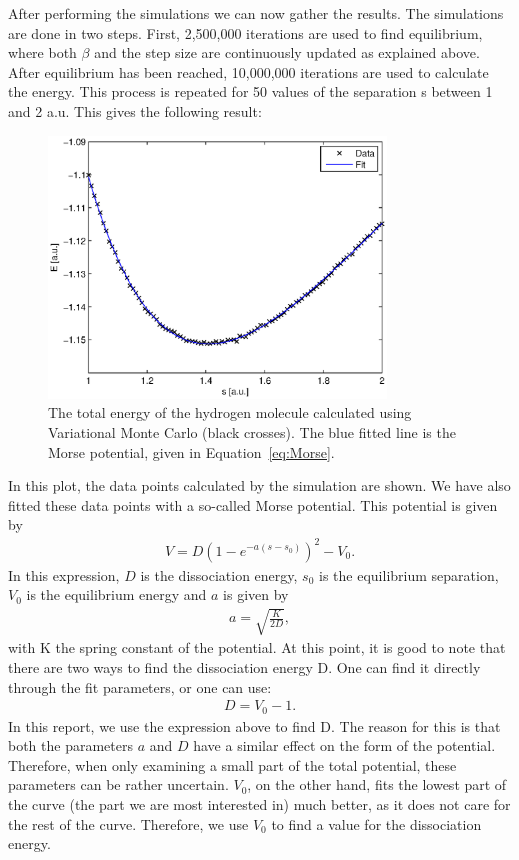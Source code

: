 After performing the simulations we can now gather the results. The simulations are done in two steps. First, 2,500,000 iterations are used to find equilibrium, where both $\beta$ and the step size are continuously updated as explained above. After equilibrium has been reached, 10,000,000 iterations are used to calculate the energy. This process is repeated for 50 values of the separation s between 1 and 2 a.u. This gives the following result:
\begin{figure}[H]
	\centering
	\includegraphics[width=0.8\textwidth]{plot.eps}
	\caption{The total energy of the hydrogen molecule calculated using Variational Monte Carlo (black crosses). The blue fitted line is the Morse potential, given in Equation~\ref{eq:Morse}.}
	\label{plot}
\end{figure}
\newpage
\noindent  In this plot, the data points calculated by the simulation are shown. We have also fitted these data points with a so-called Morse potential. This potential is given by
\begin{align}
V = D{\left( {1 - {e^{ - a\left( {s - {s_0}} \right)}}} \right)^2} - {V_0}.
\label{eq:Morse}
\end{align}
In this expression, $D$ is the dissociation energy, $s_0$ is the equilibrium separation, $V_0$ is the equilibrium energy and $a$ is given by
\begin{align}
a = \sqrt{\frac{K}{2D}},
\end{align}
with K the spring constant of the potential. At this point, it is good to note that there are two ways to find the dissociation energy D. One can find it directly through the fit parameters, or one can use:
\begin{align}
D = {V_0} - 1.
\end{align}
In this report, we use the expression above to find D. The reason for this is that both the parameters $a$ and $D$ have a similar effect on the form of the potential. Therefore, when only examining a small part of the total potential, these parameters can be rather uncertain. $V_0$, on the other hand, fits the lowest part of the curve (the part we are most interested in) much better, as it does not care for the rest of the curve. Therefore, we use $V_0$ to find a value for the dissociation energy.\\
